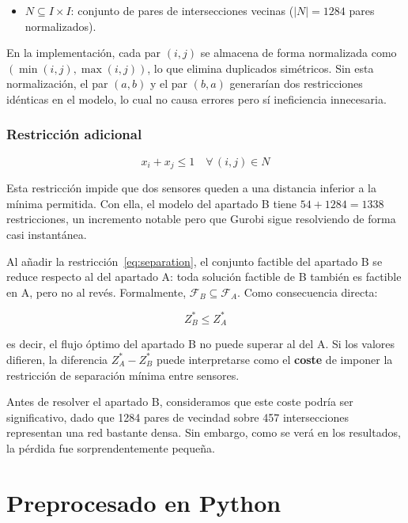 \documentclass[12pt,a4paper]{article}
\begin{document}
\begin{itemize}
    \item $N \subseteq I \times I$: conjunto de pares de intersecciones vecinas ($|N| = 1284$ pares normalizados).
\end{itemize}

En la implementación, cada par $(i,j)$ se almacena de forma normalizada como $(\min(i,j), \max(i,j))$, lo que elimina duplicados simétricos. Sin esta normalización, el par $(a,b)$ y el par $(b,a)$ generarían dos restricciones idénticas en el modelo, lo cual no causa errores pero sí ineficiencia innecesaria.

\subsubsection{Restricción adicional}

\begin{equation}
x_i + x_j \leq 1 \quad \forall\, (i,j) \in N \label{eq:separation}
\end{equation}

Esta restricción impide que dos sensores queden a una distancia inferior a la mínima permitida. Con ella, el modelo del apartado B tiene $54 + 1284 = 1338$ restricciones, un incremento notable pero que Gurobi sigue resolviendo de forma casi instantánea.

Al añadir la restricción~\eqref{eq:separation}, el conjunto factible del apartado B se reduce respecto al del apartado A: toda solución factible de B también es factible en A, pero no al revés. Formalmente, $\mathcal{F}_B \subseteq \mathcal{F}_A$. Como consecuencia directa:

\[
Z^*_B \leq Z^*_A
\]

es decir, el flujo óptimo del apartado B no puede superar al del A. Si los valores difieren, la diferencia $Z^*_A - Z^*_B$ puede interpretarse como el \textbf{coste} de imponer la restricción de separación mínima entre sensores.

Antes de resolver el apartado B, consideramos que este coste podría ser significativo, dado que 1284 pares de vecindad sobre 457 intersecciones representan una red bastante densa. Sin embargo, como se verá en los resultados, la pérdida fue sorprendentemente pequeña.

\section{Preprocesado en Python}
\end{document}
